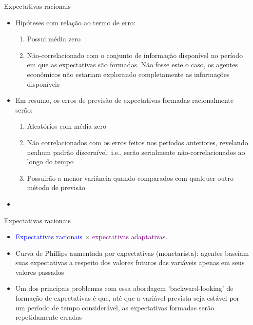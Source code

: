 \documentclass[10pt]{beamer}
\begin{document}
\begin{frame}{Expectativas racionais}
    \begin{itemize}
        \item Hipóteses com relação ao termo de erro:
        \bigskip
        \begin{enumerate}
            \item Possui média zero
            \medskip
            \item Não-correlacionado com o conjunto de informação disponível no período em que as expectativas são formadas. Não fosse este o caso, os agentes econômicos não estariam explorando completamente as informações disponíveis
        \end{enumerate}
        \bigskip
        \item Em resumo, os erros de previsão de expectativas formadas racionalmente serão:
        \bigskip
        \begin{enumerate}
            \item Aleatórios com média zero
            \medskip
            \item Não correlacionados com os erros feitos nos períodos anteriores, revelando nenhum padrão discernível: i.e., serão serialmente não-correlacionados ao longo do tempo
            \medskip
            \item Possuirão a menor variância quando comparados com qualquer outro método de previsão
        \end{enumerate}
        \bigskip
        \item {}
    \end{itemize}
\end{frame}

\begin{frame}{Expectativas racionais}
    \begin{itemize}
        \item \textcolor{blue}{Expectativas racionais} $\times$ \textcolor{purple}{expectativas adaptativas}.
        \bigskip
        \item Curva de Phillips aumentada por expectativas (monetarista): agentes baseiam suas expectativas a respeito dos valores futuros das variáveis apenas em seus valores passados
        \bigskip
        \item Um dos principais problemas com essa abordagem `backward-looking' de formação de expectativas é que, até que a variável prevista seja estável por um período de tempo considerável, as expectativas formadas serão repetidamente erradas
    \end{itemize}
\end{frame}
\end{document}
